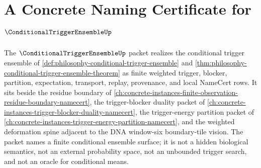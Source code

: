 \chapter{A Concrete Naming Certificate for $\ConditionalTriggerEnsembleUp$}
\label{ch:concrete-instances-conditional-trigger-ensemble-namecert}

The $\ConditionalTriggerEnsembleUp$ packet realizes the conditional trigger ensemble of \autoref{def:philosophy-conditional-trigger-ensemble} and \autoref{thm:philosophy-conditional-trigger-ensemble-theorem} as finite weighted trigger, blocker, partition, expectation, transport, replay, provenance, and local NameCert rows. It sits beside the residue boundary of \autoref{ch:concrete-instances-finite-observation-residue-boundary-namecert}, the trigger-blocker duality packet of \autoref{ch:concrete-instances-trigger-blocker-duality-namecert}, the trigger-energy partition packet of \autoref{ch:concrete-instances-trigger-energy-partition-namecert}, and the weighted deformation spine adjacent to the DNA window-six boundary-tile vision. The packet names a finite conditional ensemble surface; it is not a hidden biological semantics, not an external probability space, not an unbounded trigger search, and not an oracle for conditional means.

